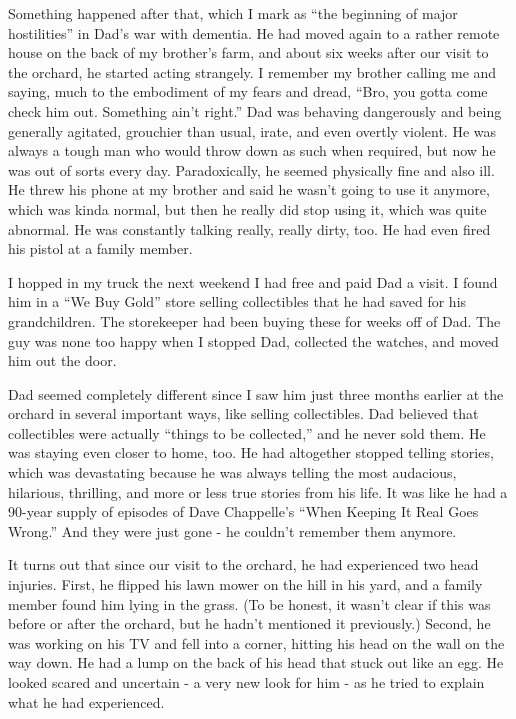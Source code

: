 \documentclass{article}
\begin{document}
Something happened after that, which I mark as ``the beginning of major hostilities'' in Dad's war with dementia. He had moved again to a rather remote house on the back of my brother's farm, and about six weeks after our visit to the orchard, he started acting strangely. I remember my brother calling me and saying, much to the embodiment of my fears and dread, ``Bro, you gotta come check him out. Something ain't right.'' Dad was behaving dangerously and being generally agitated, grouchier than usual, irate, and even overtly violent. He was always a tough man who would throw down as such when required, but now he was out of sorts every day. Paradoxically, he seemed physically fine and also ill. He threw his phone at my brother and said he wasn't going to use it anymore, which was kinda normal, but then he really did stop using it, which was quite abnormal. He was constantly talking really, really dirty, too. He had even fired his pistol at a family member.

I hopped in my truck the next weekend I had free and paid Dad a visit. I found him in a ``We Buy Gold'' store selling collectibles that he had saved for his grandchildren. The storekeeper had been buying these for weeks off of Dad. The guy was none too happy when I stopped Dad, collected the watches, and moved him out the door.

Dad seemed completely different since I saw him just three months earlier at the orchard in several important ways, like selling collectibles. Dad believed that collectibles were actually ``things to be collected,'' and he never sold them. He was staying even closer to home, too. He had altogether stopped telling stories, which was devastating because he was always telling the most audacious, hilarious, thrilling, and more or less true stories from his life. It was like he had a 90-year supply of episodes of Dave Chappelle's ``When Keeping It Real Goes Wrong.'' And they were just gone - he couldn't remember them anymore.

It turns out that since our visit to the orchard, he had experienced two head injuries. First, he flipped his lawn mower on the hill in his yard, and a family member found him lying in the grass. (To be honest, it wasn't clear if this was before or after the orchard, but he hadn't mentioned it previously.) Second, he was working on his TV and fell into a corner, hitting his head on the wall on the way down. He had a lump on the back of his head that stuck out like an egg. He looked scared and uncertain - a very new look for him - as he tried to explain what he had experienced. 
\end{document}
